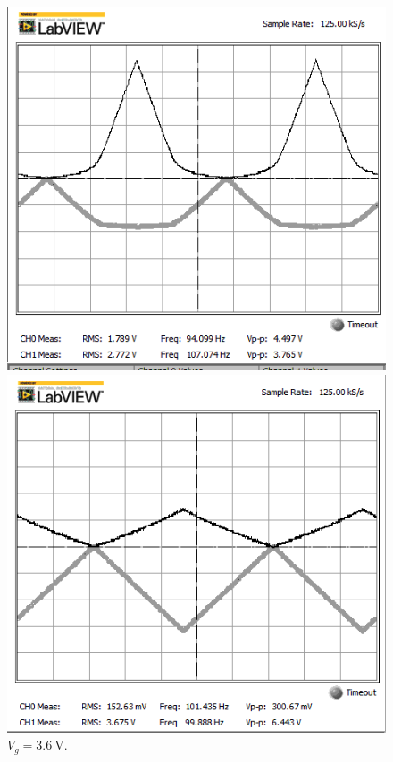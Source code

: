 \documentclass[journal]{IEEEtran}
\begin{document}
\begin{figure}[h]
\centering
\begin{minipage}{.25\textwidth}
  \centering
  \includegraphics[width=.8\linewidth]{images/1-31.png}
  \caption{$V_{g}=\SI{3.1}{\volt}$.}
\end{minipage}%
\begin{minipage}{.25\textwidth}
  \centering
  \includegraphics[width=.8\linewidth]{images/1-36.png}
  \caption{$V_{g}=\SI{3.6}{\volt}$.}
\end{minipage}
\end{figure}
\end{document}
